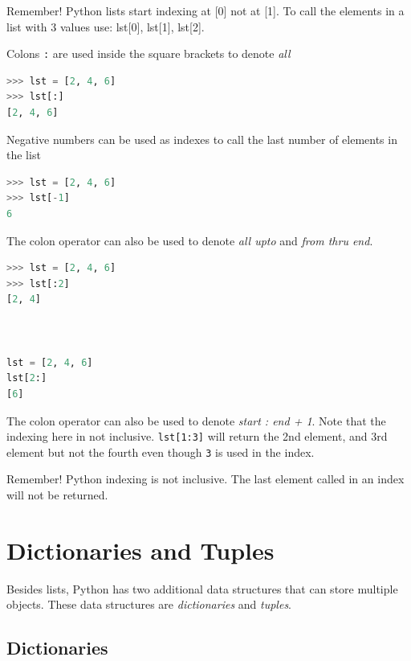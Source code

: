 \documentclass{book}
\begin{document}
Remember! Python lists start indexing at {[}0{]} not at {[}1{]}. To call
the elements in a list with 3 values use: lst{[}0{]}, lst{[}1{]},
lst{[}2{]}.

Colons \lstinline!:! are used inside the square brackets to denote
\emph{all}

\begin{lstlisting}[language=Python]
>>> lst = [2, 4, 6]
>>> lst[:]
[2, 4, 6]
\end{lstlisting}

Negative numbers can be used as indexes to call the last number of
elements in the list

\begin{lstlisting}[language=Python]
>>> lst = [2, 4, 6]
>>> lst[-1]
6
\end{lstlisting}

The colon operator can also be used to denote \emph{all upto} and
\emph{from thru end}.

\begin{lstlisting}[language=Python]
>>> lst = [2, 4, 6]
>>> lst[:2]
[2, 4]



lst = [2, 4, 6]
lst[2:]
[6]
\end{lstlisting}

The colon operator can also be used to denote \emph{start : end + 1}.
Note that the indexing here in not inclusive. \lstinline!lst[1:3]! will
return the 2nd element, and 3rd element but not the fourth even though
\lstinline!3! is used in the index.

Remember! Python indexing is not inclusive. The last element called in
an index will not be returned.
    




    
        \section{Dictionaries and Tuples}\label{dictionaries-and-tuples}
    




    
        Besides lists, Python has two additional data structures that can store
multiple objects. These data structures are \emph{dictionaries} and
\emph{tuples}.
    




    
        \subsection{Dictionaries}\label{dictionaries}
    
\end{document}
